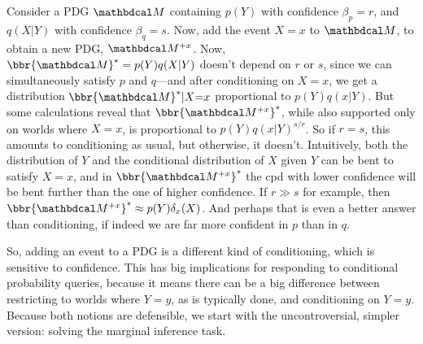 \documentclass[twoside]{article}
\begin{document}
\begin{example}
	Consider a PDG $\dg M$ containing $p(Y)$ with confidence
    $\beta_p = r$, and $q(X|Y)$ with confidence $\beta_q = s$.
    Now, add the event $X{=}x$ to $\dg M$, to obtain
    a new PDG, $\dg M^{+x}$.
	Now, $\bbr{\dg M}^* = p(Y)q(X|Y)$ doesn't depend on $r$ or $s$, since we can simultaneously satisfy $p$ and $q$---and after conditioning on $X{=}x$, we get a distribution $\bbr{\dg M}^* | X{=}x$ proportional to $p(Y) q(x|Y)$.
	But some calculations reveal that $\bbr{\dg M^{+x}}^*$,
    while also supported only on worlds where $X{=}x$, is proportional to
	$p(Y) q(x|Y)^{s/r}$.
	So if $r = s$,
    this amounts to conditioning as usual, but otherwise,
    it doesn't.
    Intuitively, both the distribution of $Y$ and the conditional distribution of $X$ given $Y$ can be bent to satisfy $X{=}x$, and in $\bbr{\dg M^{+x}}^*$ the cpd with lower confidence will be bent further than the one of higher confidence.
    If $r \gg s$ for example,
    then $\bbr{\dg M^{+x}}^* \approx
    p(Y) \delta_x(X)$.
    And perhaps that is even a better answer than conditioning, if indeed we are far more confident in $p$ than in $q$.
\end{example}

So, adding an event to a PDG is a different kind of conditioning,
which is sensitive to confidence.  This has big implications for responding to conditional probability queries, because it means there can be a big difference between restricting to worlds where $Y{=}y$, as is typically done, and conditioning on $Y{=}y$.
Because both notions are defensible,
we start with the uncontroversial, simpler version: solving the marginal inference task.
\end{document}

